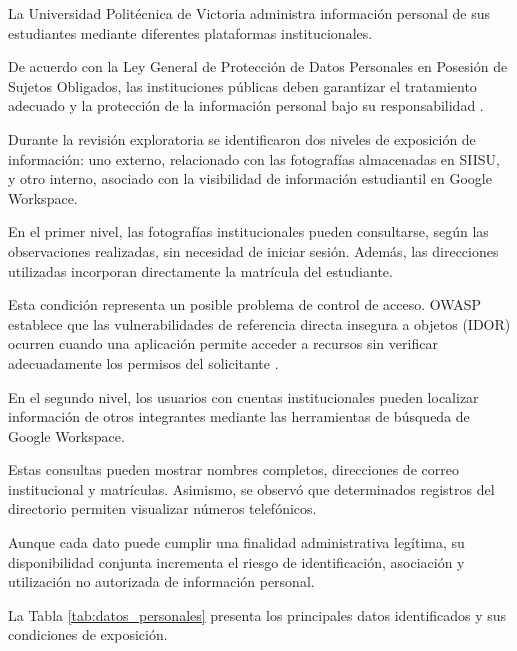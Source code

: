 \documentclass[12pt]{article}
\begin{document}
La Universidad Politécnica de Victoria administra
información personal de sus estudiantes mediante
diferentes plataformas institucionales.

De acuerdo con la Ley General de Protección de
Datos Personales en Posesión de Sujetos Obligados,
las instituciones públicas deben garantizar
el tratamiento adecuado y la protección de
la información personal bajo su responsabilidad
\parencite{lgpdppso2025}.

Durante la revisión exploratoria se identificaron
dos niveles de exposición de información:
uno externo, relacionado con las fotografías
almacenadas en SIISU, y otro interno,
asociado con la visibilidad de información
estudiantil en Google Workspace.

En el primer nivel, las fotografías institucionales
pueden consultarse, según las observaciones
realizadas, sin necesidad de iniciar sesión.
Además, las direcciones utilizadas incorporan
directamente la matrícula del estudiante.

Esta condición representa un posible problema
de control de acceso. OWASP establece que
las vulnerabilidades de referencia directa
insegura a objetos (IDOR) ocurren cuando
una aplicación permite acceder a recursos
sin verificar adecuadamente los permisos
del solicitante \parencite{owaspidor}.

En el segundo nivel, los usuarios con cuentas
institucionales pueden localizar información
de otros integrantes mediante las herramientas
de búsqueda de Google Workspace.

Estas consultas pueden mostrar nombres
completos, direcciones de correo institucional
y matrículas. Asimismo, se observó que
determinados registros del directorio
permiten visualizar números telefónicos.

Aunque cada dato puede cumplir una finalidad
administrativa legítima, su disponibilidad
conjunta incrementa el riesgo de identificación,
asociación y utilización no autorizada
de información personal.

La Tabla \ref{tab:datos_personales}
presenta los principales datos identificados
y sus condiciones de exposición.
\end{document}
